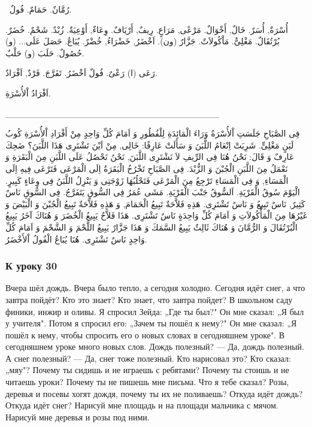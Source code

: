 \documentclass[a5paper]{article}
\begin{document}
\ رُمَّانٌ. حَمَامٌ. فُولٌ. 

أُسْرَةٌ, أُسَرٌ. خَالٌ, أَخْوَالٌ. مَرْعًى, مَرَاعٍ. رِيفٌ, أَرْيَافٌ. وِعَاءٌ, أَوْعِيَةٌ. زُبْدٌ. شَحْمٌ. خُضَرٌ. بُرْتُقَالٌ. مَغْلِىٌّ. مَاْكُولاَتٌ. جَزَّارٌ (ون). اَخْضَرُ, خَضْرَاءُ, خُضْرٌ. يُبَاعُ. حَصَلَ عَلَى... (و) حُصُولٌ. حَلَبَ (و) حَلْبٌ. 

رَعَى (ا) رَعْىٌ. فُولٌ اَخْضَرُ. تَفَرَّجَ. فَرْدٌ, اَفْرَادٌ. 

اَفْرَادُ اْلأُسْرَةِ.

\_\_\_\_\_\_\_\_\_\_\_\_\_\_\_\_\_\_\_\_\_\_\_\_\_\_\_\_\_\_\_\_\_\_

فِى الصَّبَاحِ جَلَسَتِ اْلأُسْرَةُ وَرَاءَ الْمَائِدَةِ لِلْفُطُورِ وَ اَمَامَ كُلِّ وَاحِدٍ مِنْ أَفْرَادِ اْلأُسْرَةِ كُوبُ لَبَنٍ مَغْلِىٍّ. شَرِبَتْ اِنْعَامُ اللَّبَنَ وَ سَأَلَتْ عَارِفًا: خَالِى, مِنْ اَيْنَ تَشْتَرِى هَذَا اللَّبَنَ؟ ضَحِكَ عَارِفٌ وَ قَالَ: نَحْنُ هُنَا فِى الرِّيفِ لاَ نَشْتَرِى اللَّبَنَ, نَحْنُ نَحْصُلُ عَلَى اللَّبَنِ مِنَ الْبَقَرَةِ وَ نَعْمَلُ مِنَ اللَّبَنِ الْجُبْنَ وَ الزُّبْدَ. فِى الصَّبَاحِ تَخْرُخُ الْبَقَرَةُ اِلَى الْمَرْعَى فَتَرْعَى فِيهِ اِلَى الْمَسَاءِ, وَ فِى الْمَسَاءِ تَرْجِعُ مِنَ الْمَرْعَى فَتَحْلُبُهَا زَوْجَتِى وَ يَنْزِلُ اللَّبَنُ فِى وِعَاءٍ كَبِيرٍ. الْيَوْمَ سُوقُ الْقَرْيَةِ. اَلسُّوقُ جَنْبَ الْقَرْيَةِ. مَشَى عُمَرُ فِى السُّوقِ يَتَفَرَّجُ. فِى السُّوقِ نَاسٌ كَثِيرٌ, نَاسٌ تَبِيعُ وَ نَاسٌ تَشْتَرِى. هَذِهِ فَلاَّحَةٌ تَبِيعُ الْحَمَامَ, وَ هَذِهِ فَلاَّحَةٌ تَبِيعُ الْجُبْنَ وَ الْبَيْضَ وَ غَيْرُهَا مِنَ الْمَأْكُولاَتِ وَ اَمَامَ كُلِّ وَاحِدَةٍ نَاسٌ تَشْتَرِى. هَذَا فَلاَّحٌ يَبِيعُ الْخُضَرَ وَ هُنَاكَ آخَرُ يَبِيعُ الْبُرْتُقَالَ وَ الرُّمَّانَ وَ هُنَاكَ ثَالِثٌ يَبِيعُ السَّمَكَ وَ هَذَا جَزَّارٌ يَبِيعُ اللَّحْمَ وَ الشَّحْمَ وَ اَمَامَ كُلِّ وَاحِدٍ نَاسٌ تَشْتَرِى. هُنَا يُبَاعُ الْفُولُ اْلأَخْضَرُ.

\subsubsection{К уроку 30}
Вчера шёл дождь. Вчера было тепло, а сегодня холодно. Сегодня идёт снег, а что завтра пойдёт? Кто это знает? Кто знает, что завтра пойдет? В школьном саду финики, инжир и оливы. Я спросил Зейда: „Где ты был?" Он мне сказал: „Я был у учителя". Потом я спросил его: „Зачем ты пошёл к нему?" Он мне сказал: „Я пошёл к нему, чтобы спросить его о новых словах в сегодняшнем уроке". В сегодняшнем уроке много новых слов. Дождь полезный? — Да, дождь полезный. А снег полезный? — Да, снег тоже полезный. Кто нарисовал это? Кто сказал: „мяу"? Почему ты сидишь и не играешь с ребятами? Почему ты стоишь и не читаешь уроки? Почему ты не пишешь мне письма. Что я тебе сказал? Розы, деревья и посевы хогят дождя, почему ты их не поливаешь? Откуда идёт дождь? Откуда идёт снег? Нарисуй мне площадь и на площади мальчика с мячом. Нарисуй мне деревья и розы под ними.
\end{document}
